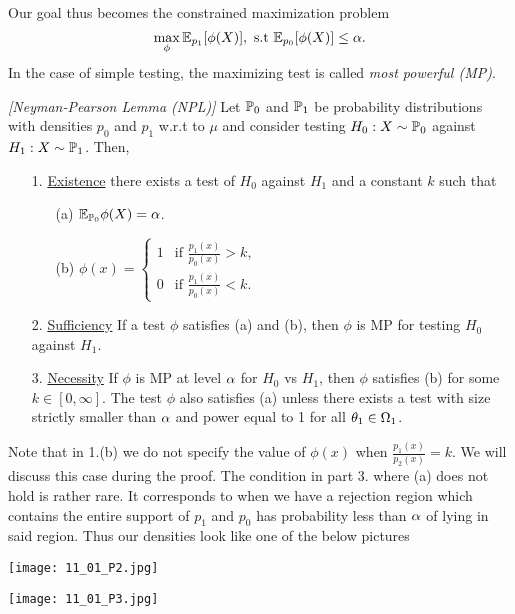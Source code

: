Our goal thus becomes the constrained maximization problem 
\[\max_\phi {\mathbb{E}}_{p_1}[\phi(X)], \text{ s.t } {\mathbb{E}}_{p_0}[\phi(X)] \le {\alpha}. \]
In the case of simple testing, the maximizing test is called \emph{most powerful (MP)}.
\begin{thrm}
    \emph{[Neyman-Pearson Lemma (NPL)]} Let ${\mathbb{P}}_0$ and ${\mathbb{P}}_1$ be probability distributions with densities $p_0$ and $p_1$ w.r.t to $\mu$ and consider testing $H_0 : X \sim {\mathbb{P}}_0$ against $H_1 : X \sim {\mathbb{P}}_1$. Then,
    \begin{enumerate}
        \item[1.] \underline{Existence} there exists a test of $H_0$ against $H_1$ and a constant $k$ such  that\begin{enumerate}
            \item[(a)] ${\mathbb{E}}_{{\mathbb{P}}_0}\phi(X) = {\alpha}$.
            \item[(b)] $\phi(x) = \begin{cases}
                1 & \text{if } \frac{p_1(x)}{p_0(x)} > k,\\
                0 & \text{if } \frac{p_1(x)}{p_0(x)} < k.
            \end{cases}$
        \end{enumerate} 
        \item[2.] \underline{Sufficiency} If a test $\phi$ satisfies (a) and (b), then $\phi$ is MP for testing $H_0$ against $H_1$.
        \item[3.] \underline{Necessity} If $\phi$ is MP at level ${\alpha}$ for $H_0$ vs $H_1$, then $\phi$ satisfies (b) for some $k \in [0,\infty]$. The test $\phi$ also satisfies (a) unless there exists a test with size strictly smaller than ${\alpha}$ and power equal to 1 for all ${\theta}_1 \in {{\Omega}}_1$. 
    \end{enumerate}
\end{thrm}
Note that in 1.(b) we do not specify the value of $\phi(x)$ when $\frac{p_1(x)}{p_2(x)} = k$. We will discuss this case during the proof. The condition in part 3. where (a) does not hold is rather rare. It corresponds to when we have a rejection region which contains the entire support of $p_1$ and $p_0$ has probability less than ${\alpha}$ of lying in said region. Thus our densities look like one of the below pictures

\begin{center}
    \texttt{[image: 11\_01\_P2.jpg]}

    \texttt{[image: 11\_01\_P3.jpg]}
\end{center}

